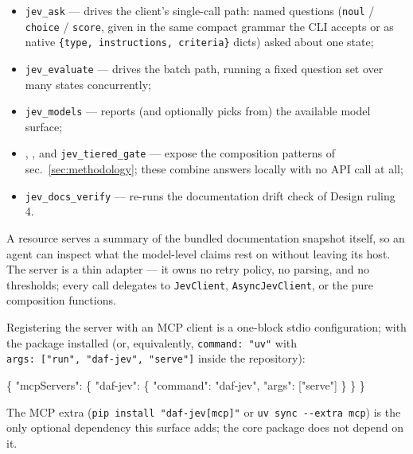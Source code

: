 \documentclass[
  english,
]{article}
\newenvironment{Shaded}{}{}
\newcommand{\DataTypeTok}[1]{\textcolor[rgb]{0.56,0.13,0.00}{#1}}
\newcommand{\FunctionTok}[1]{\textcolor[rgb]{0.02,0.16,0.49}{#1}}
\newcommand{\OtherTok}[1]{\textcolor[rgb]{0.00,0.44,0.13}{#1}}
\newcommand{\StringTok}[1]{\textcolor[rgb]{0.25,0.44,0.63}{#1}}
\providecommand{\tightlist}{%
  \setlength{\itemsep}{0pt}\setlength{\parskip}{0pt}}
\begin{document}
\begin{itemize}
\tightlist
\item
  \texttt{jev\_ask} --- drives the client's single-call path: named
  questions (\texttt{noul} / \texttt{choice} / \texttt{score}, given in
  the same compact grammar the CLI accepts or as native
  \texttt{\{type,\ instructions,\ criteria\}} dicts) asked about one
  state;
\item
  \texttt{jev\_evaluate} --- drives the batch path, running a fixed
  question set over many states concurrently;
\item
  \texttt{jev\_models} --- reports (and optionally picks from) the
  available model surface;
\item
  , , and
  \texttt{jev\_tiered\_gate} --- expose the composition patterns of
  sec.~\ref{sec:methodology}; these combine answers locally with no API
  call at all;
\item
  \texttt{jev\_docs\_verify} --- re-runs the documentation drift check
  of Design ruling 4.
\end{itemize}

A  resource serves a summary of the bundled
documentation snapshot itself, so an agent can inspect what the
model-level claims rest on without leaving its host. The server is a
thin adapter --- it owns no retry policy, no parsing, and no thresholds;
every call delegates to \texttt{JevClient}, \texttt{AsyncJevClient}, or
the pure composition functions.

Registering the server with an MCP client is a one-block stdio
configuration; with the package installed (or, equivalently,
\texttt{command:\ "uv"} with
\texttt{args:\ {[}"run",\ "daf-jev",\ "serve"{]}} inside the
repository):

\begin{Shaded}
\begin{Highlighting}[]
\FunctionTok{\{}
  \DataTypeTok{"mcpServers"}\FunctionTok{:} \FunctionTok{\{}
    \DataTypeTok{"daf{-}jev"}\FunctionTok{:} \FunctionTok{\{}
      \DataTypeTok{"command"}\FunctionTok{:} \StringTok{"daf{-}jev"}\FunctionTok{,}
      \DataTypeTok{"args"}\FunctionTok{:} \OtherTok{[}\StringTok{"serve"}\OtherTok{]}
    \FunctionTok{\}}
  \FunctionTok{\}}
\FunctionTok{\}}
\end{Highlighting}
\end{Shaded}

The MCP extra (\texttt{pip\ install\ "daf-jev{[}mcp{]}"} or
\texttt{uv\ sync\ -\/-extra\ mcp}) is the only optional dependency this
surface adds; the core package does not depend on it.
\end{document}

